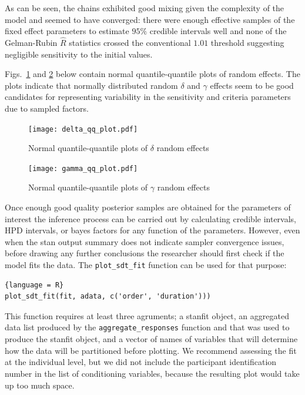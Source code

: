 \documentclass[oneside,a4paper]{article}
\begin{document}
As can be seen, the chains exhibited good mixing given the complexity
of the model and seemed to have converged: there were enough effective
samples of the fixed effect parameters to estimate $95\%$ credible
intervals well and none of the Gelman-Rubin $\hat{R}$ statistics
crossed the conventional $1.01$ threshold suggesting negligible
sensitivity to the initial values.

Figs.~\ref{fig:6} and \ref{fig:7} below contain normal
quantile-quantile plots of random effects. The plots indicate that
normally distributed random $\delta$ and $\gamma$ effects seem to be
good candidates for representing variability in the sensitivity and
criteria parameters due to sampled factors.

\begin{figure}[H]
  \centering
  \texttt{[image: delta\_qq\_plot.pdf]}
  \caption{Normal quantile-quantile plots of $\delta$ random effects}
  \label{fig:6}
\end{figure}

\begin{figure}[H]
  \centering
  \texttt{[image: gamma\_qq\_plot.pdf]}
  \caption{Normal quantile-quantile plots of $\gamma$ random effects}
  \label{fig:7}
\end{figure}

Once enough good quality posterior samples are obtained for the
parameters of interest the inference process can be carried out by
calculating credible intervals, HPD intervals, or bayes factors for
any function of the parameters. However, even when the stan output
summary does not indicate sampler convergence issues, before drawing
any further conclusions the researcher should first check if the model
fits the data. The \texttt{plot\_sdt\_fit} function can be used for
that purpose:

\begin{lstlisting}{language = R}
plot_sdt_fit(fit, adata, c('order', 'duration')))
\end{lstlisting}

This function requires at least three agruments; a stanfit object, an
aggregated data list produced by the \texttt{aggregate\_responses}
function and that was used to produce the stanfit object, and a vector
of names of variables that will determine how the data will be
partitioned before plotting. We recommend assessing the fit at the
individual level, but we did not include the participant
identification number in the list of conditioning variables, because
the resulting plot would take up too much space.
\end{document}
